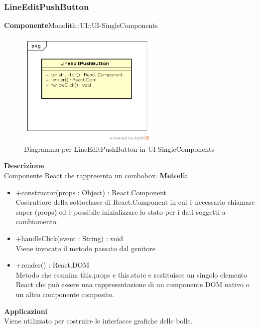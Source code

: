 \clearpage

\subsubsection{LineEditPushButton}
\textbf{Componente}Monolith::UI::UI-SingleComponents\\
   \FloatBarrier
   \begin{figure}[ht]
   \centering
   \includegraphics[width=0.6\textwidth]{img/single-LineEditPushButton}
   \caption{{Diagramma per LineEditPushButton in UI-SingleComponents}}
\end{figure}
\FloatBarrier
\textbf{Descrizione}\\
Componente React che rappresenta un combobox.
\textbf{Metodi:} \begin{itemize}\item +constructor(props : Object) : React.Component \\Costruttore della sottoclasse di React.Component in cui è necessario chiamare super (props) ed è possibile inizializzare lo stato per i dati soggetti a cambiamento.\item +handleClick(event : String) : void  \\Viene invocato il metodo passato dal genitore\item +render() : React.DOM \\Metodo che esamina this.props e this.state e restituisce un singolo elemento React che può essere una rappresentazione di un componente DOM nativo o un altro componente composito.\end{itemize} 


\textbf{Applicazioni}\\
Viene utilizzato per costruire le interfacce grafiche delle bolle. 


\clearpage

